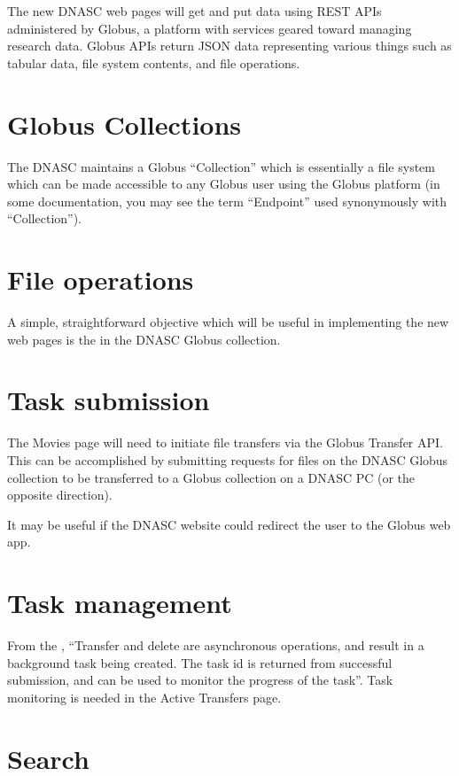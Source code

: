 
The new DNASC web pages will get and put data using REST APIs administered by Globus, 
a platform with services geared toward managing research data. Globus APIs return JSON 
data representing various things such as tabular data, file system contents, and file 
operations.
\section{Globus Collections}
The DNASC maintains a Globus ``Collection'' which is essentially a file system which 
can be made accessible to any Globus user using the Globus platform (in some documentation, 
you may see the term ``Endpoint'' used synonymously with ``Collection'').

\section{File operations}
A simple, straightforward objective which will be useful in implementing the new web 
pages is the  in the DNASC Globus collection.

\section{Task submission}
The Movies page will need to initiate file transfers via the Globus Transfer API. This 
can be accomplished by submitting requests for files on the DNASC Globus collection 
to be transferred to a Globus collection on a DNASC PC (or the opposite direction).

It may be useful if the DNASC website could redirect the user to the Globus web app.

\section{Task management}
From the , ``Transfer and delete are asynchronous 
operations, and result in a background task being created. The task id is returned from 
successful submission, and can be used to monitor the progress of the task''. Task 
monitoring is needed in the Active Transfers page.

\section{Search}


